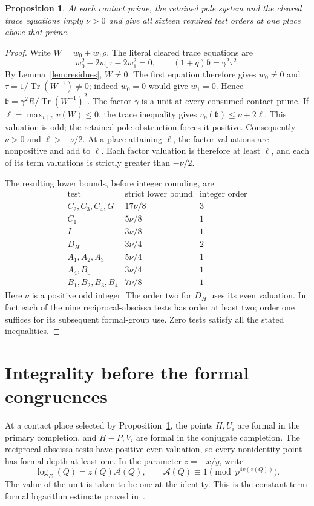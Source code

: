 \documentclass[11pt,a4paper]{article}
\newtheorem{proposition}[theorem]{Proposition}
\DeclareMathOperator{\Tr}{Tr}\DeclareMathOperator{\Nm}{Nm}
\begin{document}
\begin{proposition}\label{prop:extract}
At each contact prime, the retained pole system and the cleared trace
equations imply $\nu>0$ and give all sixteen required test orders at
one place above that prime.
\end{proposition}
\begin{proof}
Write $W=w_0+w_1\rho$. The literal cleared trace equations are
\[
 w_0^2-2w_0\tau-2w_1^2=0,\qquad (1+q)\mathfrak b=\gamma^2\tau^2.
\]
By Lemma~\ref{lem:residues}, $W\ne0$. The first equation therefore
gives $w_0\ne0$ and $\tau=1/\Tr(W^{-1})\ne0$; indeed $w_0=0$
would give $w_1=0$. Hence
$\mathfrak b=\gamma^2R/\Tr(W^{-1})^2$. The factor $\gamma$ is a unit at every consumed contact prime. If
$\ell=\max_{v\mid p}v(W)\le0$, the trace inequality gives
$v_p(\mathfrak b)\le\nu+2\ell$.
This valuation is odd; the retained pole obstruction forces it positive.
Consequently $\nu>0$ and $\ell>-\nu/2$.
At a place attaining $\ell$, the factor valuations are nonpositive
and add to $\ell$. Each factor valuation is therefore at least $\ell$,
and each of its term valuations is strictly greater than $-\nu/2$.

The resulting lower bounds, before integer rounding, are
\[
\begin{array}{c|c|c}
\text{test}&\text{strict lower bound}&\text{integer order}\\\hline
C_2,C_3,C_4,G&17\nu/8&3\\
C_1&5\nu/8&1\\
I&3\nu/8&1\\
D_H&3\nu/4&2\\
A_1,A_2,A_3&5\nu/4&1\\
A_4,B_0&3\nu/4&1\\
B_1,B_2,B_3,B_4&7\nu/8&1
\end{array}
\]
Here $\nu$ is a positive odd integer. The order two for $D_H$ uses
its even valuation. In fact each of the nine reciprocal-abscissa
tests has order at least two; order one suffices for its subsequent
formal-group use. Zero tests satisfy all the stated inequalities.
\end{proof}

\section{Integrality before the formal congruences}
At a contact place selected by Proposition~\ref{prop:extract}, the
points $H,U_i$ are formal in the primary completion, and $H-P,V_i$
are formal in the conjugate completion. The reciprocal-abscissa
tests have positive even valuation, so every nonidentity point has
formal depth at least one. In the parameter $z=-x/y$, write
\[
 \log_E(Q)=z(Q)\mathcal A(Q),\qquad
 \mathcal A(Q)\equiv1\pmod{p^{4v(z(Q))}}.
\]
The value of the unit is taken to be one at the identity. This is
the constant-term formal logarithm estimate proved in~\cite{Logs}.
\end{document}
